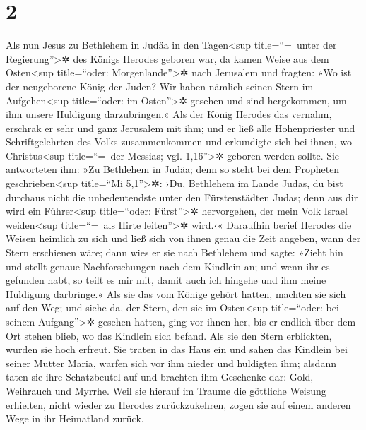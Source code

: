 \hypertarget{section-1}{%
\section{2}\label{section-1}}

 Als nun Jesus zu Bethlehem in Judäa in den
Tagen\textless sup title=``=~unter der Regierung''\textgreater✲ des
Königs Herodes geboren war, da kamen Weise aus dem Osten\textless sup
title=``oder: Morgenlande''\textgreater✲ nach Jerusalem 
und fragten: »Wo ist der neugeborene König der Juden? Wir haben nämlich
seinen Stern im Aufgehen\textless sup title=``oder: im
Osten''\textgreater✲ gesehen und sind hergekommen, um ihm unsere
Huldigung darzubringen.«  Als der König Herodes das
vernahm, erschrak er sehr und ganz Jerusalem mit ihm;  und
er ließ alle Hohenpriester und Schriftgelehrten des Volks zusammenkommen
und erkundigte sich bei ihnen, wo Christus\textless sup title=``=~der
Messias; vgl. 1,16''\textgreater✲ geboren werden sollte. 
Sie antworteten ihm: »Zu Bethlehem in Judäa; denn so steht bei dem
Propheten geschrieben\textless sup title=``Mi 5,1''\textgreater✲:
 ›Du, Bethlehem im Lande Judas, du bist durchaus nicht die
unbedeutendste unter den Fürstenstädten Judas; denn aus dir wird ein
Führer\textless sup title=``oder: Fürst''\textgreater✲ hervorgehen, der
mein Volk Israel weiden\textless sup title=``=~als Hirte
leiten''\textgreater✲ wird.‹«  Daraufhin berief Herodes
die Weisen heimlich zu sich und ließ sich von ihnen genau die Zeit
angeben, wann der Stern erschienen wäre;  dann wies er sie
nach Bethlehem und sagte: »Zieht hin und stellt genaue Nachforschungen
nach dem Kindlein an; und wenn ihr es gefunden habt, so teilt es mir
mit, damit auch ich hingehe und ihm meine Huldigung darbringe.«
 Als sie das vom Könige gehört hatten, machten sie sich
auf den Weg; und siehe da, der Stern, den sie im Osten\textless sup
title=``oder: bei seinem Aufgang''\textgreater✲ gesehen hatten, ging vor
ihnen her, bis er endlich über dem Ort stehen blieb, wo das Kindlein
sich befand.  Als sie den Stern erblickten, wurden sie
hoch erfreut.  Sie traten in das Haus ein und sahen das
Kindlein bei seiner Mutter Maria, warfen sich vor ihm nieder und
huldigten ihm; alsdann taten sie ihre Schatzbeutel auf und brachten ihm
Geschenke dar: Gold, Weihrauch und Myrrhe.  Weil sie
hierauf im Traume die göttliche Weisung erhielten, nicht wieder zu
Herodes zurückzukehren, zogen sie auf einem anderen Wege in ihr
Heimatland zurück.

